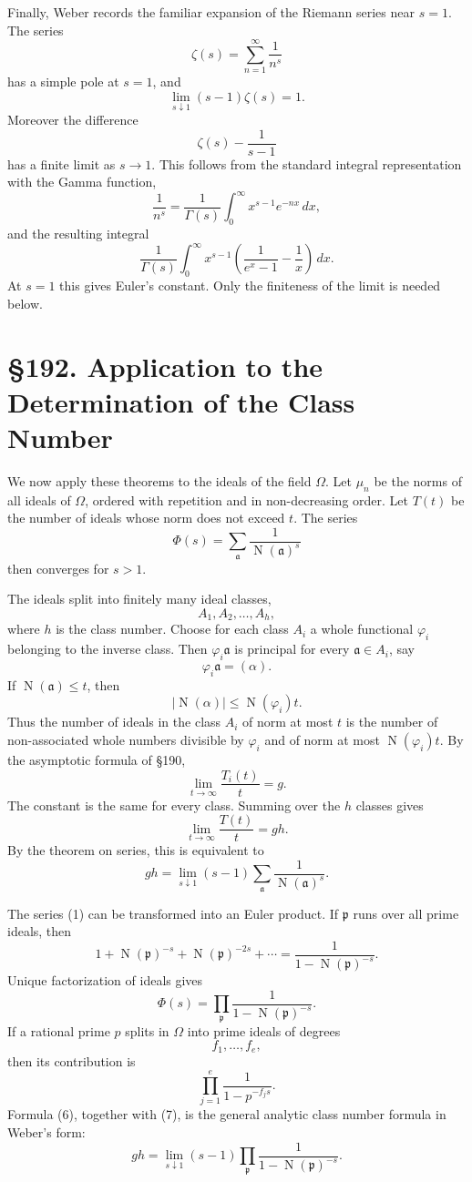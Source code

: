 \documentclass[11pt,a4paper]{book}
\newcommand{\webersection}[2]{\clearpage\section*{\S #1. #2}}
\providecommand{\idealp}{\mathfrak p}
\providecommand{\ideala}{\mathfrak a}
\providecommand{\N}{\operatorname{N}}
\begin{document}
Finally, Weber records the familiar expansion of the Riemann series near \(s=1\).  The series
\[
  \zeta(s)=\sum_{n=1}^{\infty}\frac1{n^s}
\]
has a simple pole at \(s=1\), and
\[
  \lim_{s\downarrow1}(s-1)\zeta(s)=1.
\tag{8}
\]
Moreover the difference
\[
  \zeta(s)-\frac1{s-1}
\]
has a finite limit as \(s\to1\).  This follows from the standard integral representation with the Gamma function,
\[
  \frac1{n^s}=\frac1{\Gamma(s)}\int_0^\infty x^{s-1}e^{-nx}\,dx,
\]
and the resulting integral
\[
  \frac1{\Gamma(s)}\int_0^\infty x^{s-1}
  \left(\frac1{e^x-1}-\frac1x\right)
  \,dx.
\]
At \(s=1\) this gives Euler's constant.  Only the finiteness of the limit is needed below.

\webersection{192}{Application to the Determination of the Class Number}

We now apply these theorems to the ideals of the field \(\Omega\).  Let \(\mu_n\) be the norms of all ideals of \(\Omega\), ordered with repetition and in non-decreasing order.  Let \(T(t)\) be the number of ideals whose norm does not exceed \(t\).  The series
\[
  \Phi(s)=\sum_{\ideala}\frac1{\N(\ideala)^s}
\tag{1}
\]
then converges for \(s>1\).

The ideals split into finitely many ideal classes,
\[
  A_1,A_2,
\ldots,A_h,
\]
where \(h\) is the class number.  Choose for each class \(A_i\) a whole functional \(\varphi_i\) belonging to the inverse class.  Then \(\varphi_i\ideala\) is principal for every \(\ideala\in A_i\), say
\[
  \varphi_i\ideala=(\alpha).
\tag{2}
\]
If \(\N(\ideala)
\le t\), then
\[
  |
\N(\alpha)|\le \N(\varphi_i)t.
\tag{3}
\]
Thus the number of ideals in the class \(A_i\) of norm at most \(t\) is the number of non-associated whole numbers divisible by \(\varphi_i\) and of norm at most \(\N(\varphi_i)t\).  By the asymptotic formula of \S190,
\[
  \lim_{t\to\infty}\frac{T_i(t)}{t}=g.
\tag{4}
\]
The constant is the same for every class.  Summing over the \(h\) classes gives
\[
  \lim_{t\to\infty}\frac{T(t)}{t}=gh.
\tag{5}
\]
By the theorem on series, this is equivalent to
\[
  gh=\lim_{s\downarrow1}(s-1)
  \sum_{\ideala}\frac1{\N(\ideala)^s}.
\tag{6}
\]

The series (1) can be transformed into an Euler product.  If \(\idealp\) runs over all prime ideals, then
\[
  1+\N(\idealp)^{-s}+\N(\idealp)^{-2s}+\cdots
  =\frac1{1-\N(\idealp)^{-s}}.
\]
Unique factorization of ideals gives
\[
  \Phi(s)=\prod_{\idealp}
  \frac1{1-\N(\idealp)^{-s}}.
\tag{7}
\]
If a rational prime \(p\) splits in \(\Omega\) into prime ideals of degrees
\[
  f_1,
\ldots,f_e,
\]
then its contribution is
\[
  \prod_{j=1}^{e}\frac1{1-p^{-f_j s}}.
\tag{8}
\]
Formula (6), together with (7), is the general analytic class number formula in Weber's form:
\[
  gh=\lim_{s\downarrow1}(s-1)
  \prod_{\idealp}
  \frac1{1-\N(\idealp)^{-s}}.
\tag{9}
\]
\end{document}
